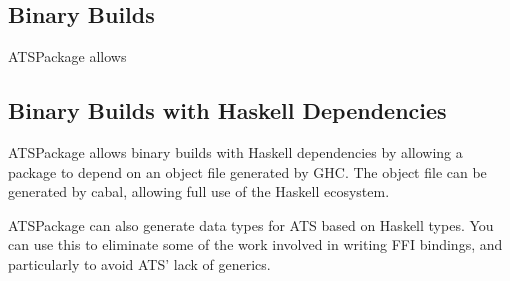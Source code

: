 \documentclass{article}
\begin{document}
\subsection{Binary Builds}

ATSPackage allows 

\subsection{Binary Builds with Haskell Dependencies}

ATSPackage allows binary builds with Haskell dependencies by allowing a package
to depend on an object file generated by GHC. The object file can be generated
by cabal, allowing full use of the Haskell ecosystem.

ATSPackage can also generate data types for ATS based on Haskell types. You can
use this to eliminate some of the work involved in writing FFI bindings, and
particularly to avoid ATS' lack of generics.
\end{document}
